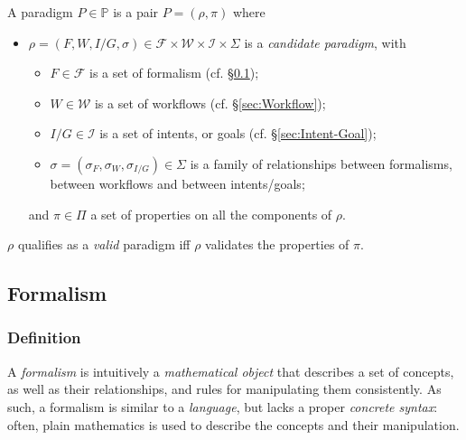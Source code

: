 \begin{definition}[Paradigm]
    A paradigm $P\in \mathbb{P}$ is a pair $P = (\rho, \pi)$ where
    \begin{itemize}
        \item $\rho = (F, W, I/G, \sigma) \in \mathcal{F}\times \mathcal{W} \times \mathcal{I} \times \Sigma$ is a \emph{candidate paradigm}, with
        \begin{itemize}
            \item $F\in\mathcal{F}$ is a set of formalism (cf. \S \ref{sec:Formalism});
            
            \item $W\in \mathcal{W}$ is a set of workflows (cf. \S \ref{sec:Workflow});
            
            \item $I/G\in \mathcal{I}$ is a set of intents, or goals (cf. \S \ref{sec:Intent-Goal});
            
            \item $\sigma =(\sigma_{F}, \sigma_{W}, \sigma_{I/G}) \in \Sigma$ is a family of relationships between formalisms, between workflows and between intents/goals;
        \end{itemize}
        and $\pi\in \Pi$ a set of properties on all the components of $\rho$. 
    \end{itemize}
    $\rho$ qualifies as a \emph{valid} paradigm iff $\rho$ validates the properties of $\pi$.
\end{definition}


\subsection{Formalism}
\label{sec:Formalism}


\subsubsection{Definition}
\label{sec:Formalism-Definition}

A \emph{formalism} is intuitively a \emph{mathematical object} 
\cite{BromanViewpointsformalismslanguages2012} that describes a set of concepts,
as well as their relationships, and rules for manipulating them consistently. As
such, a formalism is similar to a \emph{language}, but lacks a proper 
\emph{concrete syntax}: often, plain mathematics is used to describe the 
concepts and their manipulation. 

